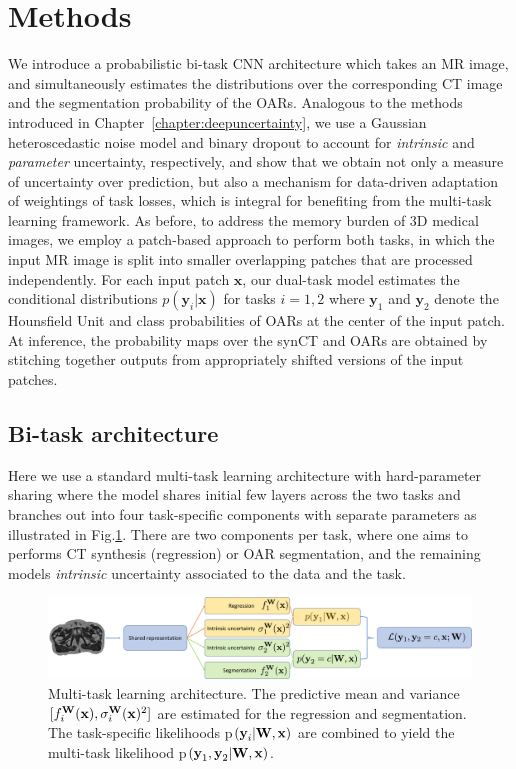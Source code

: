 \section{Methods}
We introduce a probabilistic bi-task CNN architecture which takes an MR image, and simultaneously estimates the distributions over the corresponding CT image and the segmentation probability of the OARs. Analogous to the methods introduced in Chapter~\ref{chapter:deepuncertainty}, we use a Gaussian heteroscedastic noise model \cite{nix1994estimating} and binary dropout \cite{srivastava2014dropout} to account for \textit{intrinsic} and \textit{parameter} uncertainty, respectively, and show that we obtain not only a measure of uncertainty over prediction, but also a mechanism for data-driven adaptation of weightings of task losses, which is integral for benefiting from the multi-task learning framework. As before, to address the memory burden of 3D medical images, we employ a patch-based approach to perform both tasks, in which the input MR image is split into smaller overlapping patches that are processed independently. For each input patch $\mathbf{x}$, our dual-task model estimates the conditional distributions $p(\mathbf{y}_i|\mathbf{x})$ for tasks $i=1,2$ where $\mathbf{y}_1$ and $\mathbf{y}_2$ denote the Hounsfield Unit and class probabilities of OARs at the center of the input patch. At inference, the probability maps over the synCT and OARs are obtained by stitching together outputs from appropriately shifted versions of the input patches.

\subsection{Bi-task architecture}
Here we use a standard multi-task learning architecture with hard-parameter sharing \cite{Caruana1993MultitaskLA} where the model shares initial few layers across the two tasks and branches out into four task-specific components with separate parameters as illustrated in Fig.\ref{fig:diagram}. There are two components per task, where one aims to performs CT synthesis (regression) or OAR segmentation, and the remaining models \emph{intrinsic} uncertainty associated to the data and the task.
	\begin{figure}[!b]
		\centering
\includegraphics[height=0.185\textwidth]{chapter_5/figures/final_for_ryu_MT.pdf}
		\caption{\footnotesize Multi-task learning architecture. The predictive mean and variance $[f^{\mathbf{W}}_i(\text{\textbf{x}}), \sigma_{i}^{\mathbf{W}}(\text{\textbf{x}})^{2}]$ are estimated for the regression and segmentation. The task-specific likelihoods p$\left(\text{\textbf{y}}_{i}|\text{\textbf{W}},\text{\textbf{x}}\right)$ are combined to yield the multi-task likelihood p$\left(\text{\textbf{y}}_{1}, \text{\textbf{y}}_{2}|\text{\textbf{W}},\mathbf{x}\right)$.} 
		\label{fig:diagram}
	\end{figure}
    

